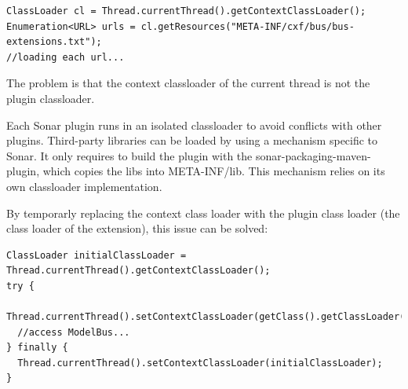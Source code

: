 \begin{verbatim}
ClassLoader cl = Thread.currentThread().getContextClassLoader();
Enumeration<URL> urls = cl.getResources("META-INF/cxf/bus/bus-extensions.txt");
//loading each url...
\end{verbatim}

The problem is that the context classloader of the current thread is not the plugin classloader.

Each Sonar plugin runs in an isolated classloader to avoid conflicts with other plugins. Third-party libraries can be loaded by using a mechanism specific to Sonar. It only requires to build the plugin with the sonar-packaging-maven-plugin, which copies the libs into META-INF/lib. This mechanism relies on its own classloader implementation.

By temporarly replacing the context class loader with the plugin class loader (the class loader of the extension), this issue can be solved:
\begin{verbatim}
ClassLoader initialClassLoader = Thread.currentThread().getContextClassLoader();
try {
  Thread.currentThread().setContextClassLoader(getClass().getClassLoader());
  //access ModelBus...
} finally {
  Thread.currentThread().setContextClassLoader(initialClassLoader);
}
\end{verbatim}